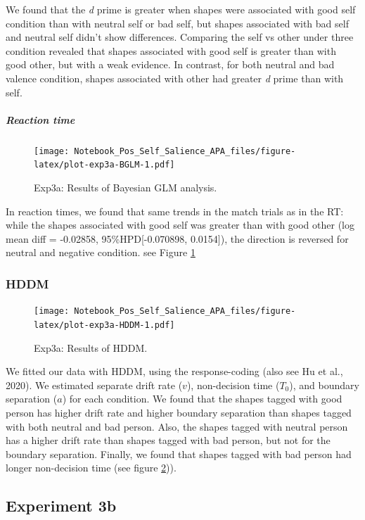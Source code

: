 \documentclass[
  english,
  man]{apa6}
\let\oldsubparagraph\subparagraph
\renewcommand{\subparagraph}[1]{\oldsubparagraph{#1}\mbox{}}
\begin{document}
We found that the \emph{d} prime is greater when shapes were associated with good self condition than with neutral self or bad self, but shapes associated with bad self and neutral self didn't show differences. Comparing the self vs other under three condition revealed that shapes associated with good self is greater than with good other, but with a weak evidence. In contrast, for both neutral and bad valence condition, shapes associated with other had greater \emph{d} prime than with self.

\hypertarget{reaction-time-5}{%
\subparagraph{Reaction time}\label{reaction-time-5}}

\begin{figure}
\centering
\texttt{[image: Notebook\_Pos\_Self\_Salience\_APA\_files/figure-latex/plot-exp3a-BGLM-1.pdf]}
\caption{\label{fig:plot-exp3a-BGLM}Exp3a: Results of Bayesian GLM analysis.}
\end{figure}

In reaction times, we found that same trends in the match trials as in the RT: while the shapes associated with good self was greater than with good other (log mean diff = -0.02858, 95\%HPD{[}-0.070898, 0.0154{]}), the direction is reversed for neutral and negative condition. see Figure \ref{fig:plot-exp3a-BGLM}

\hypertarget{hddm-5}{%
\subsubsection{HDDM}\label{hddm-5}}

\begin{figure}
\centering
\texttt{[image: Notebook\_Pos\_Self\_Salience\_APA\_files/figure-latex/plot-exp3a-HDDM-1.pdf]}
\caption{\label{fig:plot-exp3a-HDDM}Exp3a: Results of HDDM.}
\end{figure}

We fitted our data with HDDM, using the response-coding (also see Hu et al., 2020). We estimated separate drift rate (\(v\)), non-decision time (\(T_{0}\)), and boundary separation (\(a\)) for each condition. We found that the shapes tagged with good person has higher drift rate and higher boundary separation than shapes tagged with both neutral and bad person. Also, the shapes tagged with neutral person has a higher drift rate than shapes tagged with bad person, but not for the boundary separation. Finally, we found that shapes tagged with bad person had longer non-decision time (see figure \ref{fig:plot-exp3a-HDDM})).

\hypertarget{experiment-3b}{%
\subsection{Experiment 3b}\label{experiment-3b}}
\end{document}
